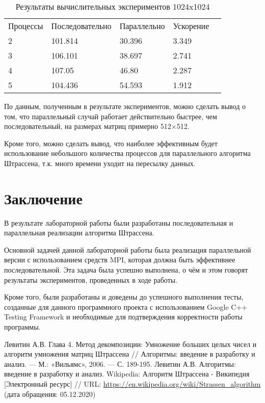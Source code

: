 \documentclass{report}
\begin{document}
\begin{table}[!h]
\caption{Результаты вычислительных экспериментов 1024x1024}
\centering
\begin{tabular}{lllll}
Процессы & Последовательно & Параллельно & Ускорение   \\
2        & 101.814         & 30.396      & 3.349        \\
3        & 106.101         & 38.697      & 2.741       \\
4        & 107.05          & 46.80       & 2.287       \\
5        & 104.436         & 54.593      & 1.912       \\
\end{tabular}
\end{table}
\par По данным, полученным в результате экспериментов, можно сделать вывод о том, что параллельный случай работает действительно быстрее, чем последовательный, на размерах матриц примерно 512$\times$512. 
\par Кроме того, можно сделать вывод, что наиболее эффективным будет использование небольшого количества процессов для параллельного алгоритма Штрассена, т.к. много времени уходит на пересылку данных.
\newpage

\section*{Заключение}
В результате лабораторной работы были разработаны последовательная и параллельная реализации алгоритма Штрассена.
\par Основной задачей данной лабораторной работы была реализация параллельной версии с использованием средств MPI, которая должна быть эффективнее последовательной. Эта задача была успешно выполнена, о чём и этом говорят результаты экспериментов, проведенных в ходе работы. 
\par Кроме того, были разработаны и доведены до успешного выполнения тесты, созданные для данного программного проекта с использованием Google C++ Testing Framework и необходимые для подтверждения корректности работы программы.
\newpage

\begin{thebibliography}{1}
 Левитин А.В. Глава 4. Метод декомпозиции: Умножение больших целых чисел и алгоритм умножения матриц Штрассена // Алгоритмы: введение в разработку и анализ. — М.: «Вильямс», 2006. — С. 189-195. 
Левитин А.В. Алгоритмы: введение в разработку и анализ.
 Wikipedia: Алгоритм Штрассена - Википедия [Электронный ресурс] // URL: \url {https://en.wikipedia.org/wiki/Strassen_algorithm} (дата обращения: 05.12.2020)

\end{thebibliography}
\newpage
\end{document}
